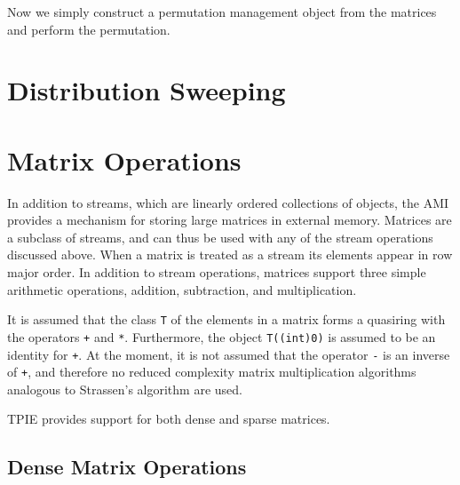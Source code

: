 
 
Now we simply construct a permutation management object from the
matrices and perform the permutation.



\section{Distribution Sweeping} 

\tobewritten

\section{Matrix Operations}



In addition to streams, which are linearly ordered collections of objects,
the AMI provides a mechanism for storing large matrices in external memory.
Matrices are a subclass of streams, and can thus be used with any of the
stream operations discussed above.  When a matrix is treated as a stream
its elements appear in row major order.  In addition to stream operations,
matrices support three simple arithmetic operations, addition, subtraction,
and multiplication.

It is assumed that the class \lstinline|T| of the elements in a matrix forms a
quasiring with the operators \lstinline|+| and \lstinline|*|.  Furthermore, the
object \lstinline|T((int)0)| is assumed to be an identity for \lstinline|+|.  At the
moment, it is not assumed that the operator
\lstinline|-| is an inverse of \lstinline|+|, and therefore no reduced
complexity matrix multiplication algorithms analogous to Strassen's
algorithm are used.

TPIE provides support for both dense and sparse matrices.

\subsection{Dense Matrix Operations}


